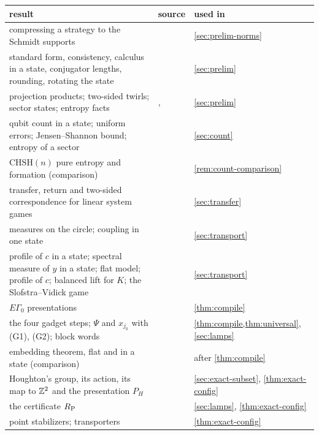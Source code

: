 {\small
\begin{longtable}{@{}L{0.45\textwidth}L{0.21\textwidth}L{0.26\textwidth}@{}}
\toprule
result & source & used in\\
\midrule
\endhead
compressing a strategy to the Schmidt supports & \cite[Rem.~2.9]{DM-game} & \cref{sec:prelim-norms}\\
standard form, consistency, calculus in a state, conjugator lengths, rounding, rotating the state & \cite[Lemmas~3.1--3.4,
3.6, 3.7]{DM-game} & \cref{sec:prelim}\\
projection products; two-sided twirls; sector states; entropy facts & \cite[Lemmas~3.8--3.10, \S3.7]{DM-game},
\cite[Lemma~4.1]{DM-H3} & \cref{sec:prelim}\\
qubit count in a state; uniform errors; Jensen--Shannon bound; entropy of a sector & \cite[Thm.~4.1, Cor.~4.2, Lemmas~4.8,
4.9]{DM-game} & \cref{sec:count}\\
$\mathrm{CHSH}(n)$ pure entropy and formation (comparison) & \cite[Thm.~E]{DM-game} & \cref{rem:count-comparison}\\
transfer, return and two-sided correspondence for linear system games & \cite[Thms.~5.1, 5.4, Cor.~5.5]{DM-game} &
\cref{sec:transfer}\\
\midrule
measures on the circle; coupling in one state & \cite[Lemmas~11.7, 11.8]{DM-game} & \cref{sec:transport}\\
profile of $c$ in a state; spectral measure of $y$ in a state; flat model; profile of $c$; balanced lift for $K$; the
Slofstra--Vidick game & \cite[Thm.~11.9, Prop.~11.10, Ex.~11.11, Cor.~11.12, Lemma~11.13, Thm.~11.14]{DM-game} &
\cref{sec:transport}\\
\midrule
$E\Gamma_0$ presentations & \cite[Def.~10.1]{DM-game} & \cref{thm:compile}\\
the four gadget steps; $\Psi$ and $x_{j_0}$ with (G1), (G2); block words & \cite[Lemma~B.1, Table~3]{DM-game} &
\cref{thm:compile,thm:universal}, \cref{sec:lamps}\\
embedding theorem, flat and in a state (comparison) & \cite[Thm.~B.3]{DM-game} & after \cref{thm:compile}\\
\midrule
Houghton's group, its action, its map to $\mathbb Z^2$ and the presentation $P_H$ & \cite[Def.~6.1, (5), (6), App.~A]{DM-game} &
\cref{sec:exact-subset}, \cref{thm:exact-config}\\
the certificate $R_{\mathrm P}$ & \cite[Def.~7.1, Table~2]{DM-game} & \cref{sec:lamps}, \cref{thm:exact-config}\\
point stabilizers; transporters & \cite[Lemma~7.4, Def.~7.5]{DM-game} & \cref{thm:exact-config}\\

\end{longtable}}

